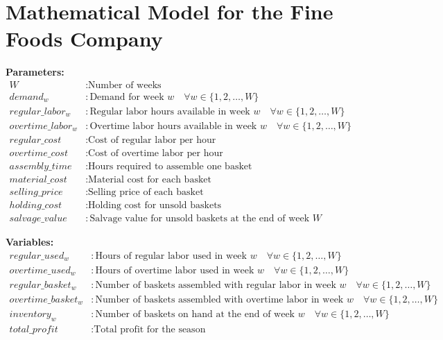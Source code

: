 \documentclass{article}
\begin{document}
\section*{Mathematical Model for the Fine Foods Company}

\textbf{Parameters:}
\begin{align*}
    W & : \text{Number of weeks} \\
    demand_w & : \text{Demand for week } w \quad \forall w \in \{1, 2, \ldots, W\} \\
    regular\_labor_w & : \text{Regular labor hours available in week } w \quad \forall w \in \{1, 2, \ldots, W\} \\
    overtime\_labor_w & : \text{Overtime labor hours available in week } w \quad \forall w \in \{1, 2, \ldots, W\} \\
    regular\_cost & : \text{Cost of regular labor per hour} \\
    overtime\_cost & : \text{Cost of overtime labor per hour} \\
    assembly\_time & : \text{Hours required to assemble one basket} \\
    material\_cost & : \text{Material cost for each basket} \\
    selling\_price & : \text{Selling price of each basket} \\
    holding\_cost & : \text{Holding cost for unsold baskets} \\
    salvage\_value & : \text{Salvage value for unsold baskets at the end of week } W
\end{align*}

\textbf{Variables:}
\begin{align*}
    regular\_used_w & : \text{Hours of regular labor used in week } w \quad \forall w \in \{1, 2, \ldots, W\} \\
    overtime\_used_w & : \text{Hours of overtime labor used in week } w \quad \forall w \in \{1, 2, \ldots, W\} \\
    regular\_basket_w & : \text{Number of baskets assembled with regular labor in week } w \quad \forall w \in \{1, 2, \ldots, W\} \\
    overtime\_basket_w & : \text{Number of baskets assembled with overtime labor in week } w \quad \forall w \in \{1, 2, \ldots, W\} \\
    inventory_w & : \text{Number of baskets on hand at the end of week } w \quad \forall w \in \{1, 2, \ldots, W\} \\
    total\_profit & : \text{Total profit for the season}
\end{align*}
\end{document}
